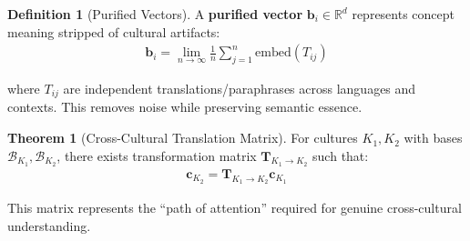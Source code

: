 \documentclass[11pt,a4paper]{article}
\theoremstyle{definition}
\newtheorem{definition}{Definition}[section]
\newtheorem{theorem}{Theorem}[section]
\theoremstyle{remark}
\newcommand{\RR}{\mathbb{R}}
\newcommand{\bb}{\mathbf{b}}
\newcommand{\cc}{\mathbf{c}}
\newcommand{\TT}{\mathbf{T}}
\begin{document}
\begin{definition}[Purified Vectors]
A \textbf{purified vector} \(\bb_i \in \RR^d\) represents concept meaning stripped of cultural artifacts:
\begin{align}
\bb_i = \lim_{n \rightarrow \infty} \frac{1}{n} \sum_{j=1}^n \text{embed}(T_{ij})
\end{align}

where \(T_{ij}\) are independent translations/paraphrases across languages and contexts. This removes noise while preserving semantic essence.
\end{definition}

\begin{theorem}[Cross-Cultural Translation Matrix]
For cultures \(K_1, K_2\) with bases \(\mathcal{B}_{K_1}, \mathcal{B}_{K_2}\), there exists transformation matrix \(\TT_{K_1 \to K_2}\) such that:
\begin{align}
\cc_{K_2} = \TT_{K_1 \to K_2} \cc_{K_1}
\end{align}

This matrix represents the ``path of attention'' required for genuine cross-cultural understanding.
\end{theorem}
\end{document}
